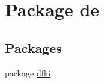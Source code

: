 \hypertarget{namespacede}{\section{Package de}
\label{namespacede}
}
\subsection*{Packages}
\begin{DoxyCompactItemize}
\item 
package \hyperlink{namespacede_1_1dfki}{dfki}
\end{DoxyCompactItemize}
